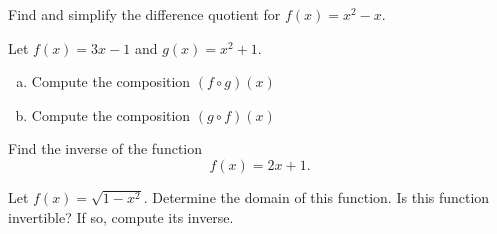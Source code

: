 \documentclass[12pt]{amsart}
\begin{document}
\newpage

\begin{thm}
  Find and simplify the difference quotient for $f(x) = x^2 - x$.
\end{thm}

\newpage

\begin{thm}
  Let $f(x) = 3x - 1$ and $g(x) = x^2 + 1$.
  \begin{enumerate}[(a)]
  \item
    Compute the composition $(f \circ g)(x)$
    \vspace{4in}
  \item
    Compute the composition $(g \circ f)(x)$
  \end{enumerate}
\end{thm}

\newpage

\begin{thm}
  Find the inverse of the function
  $$f(x) = 2x + 1.$$
\end{thm}

\newpage

\begin{thm}[Bonus]
  Let $f(x) = \sqrt{1 - x^2}$.  Determine the domain of this function.
  Is this function invertible?
  If so, compute its inverse.
\end{thm}
\end{document}

